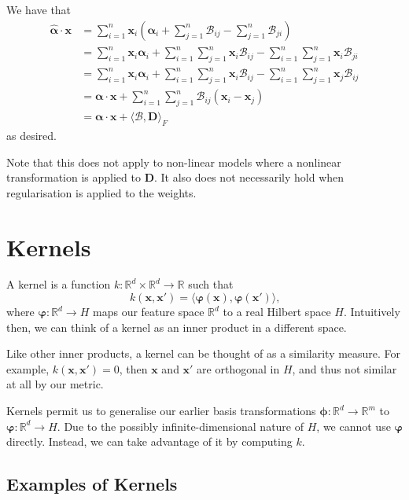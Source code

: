 \documentclass[11pt,twoside,openright]{report}
\newcommand\bphi{\bm{\phi}}
\newcommand\bvarphi{\bm{\varphi}}
\newcommand\bbR{\mathbb{R}}
\newcommand\bx{\mathbf{x}}
\begin{document}
We have that\begin{align*}
    \hat{\bm{\alpha}} \cdot \mathbf{x} &= \sum_{i=1}^n \mathbf{x}_i\left( \bm{\alpha}_i + \sum_{j=1}^n \mathcal{B}_{ij} - \sum_{j=1}^n \mathcal{B}_{ji} \right) \\
    &= \sum_{i=1}^n \mathbf{x}_i\bm{\alpha}_i +  \sum_{i=1}^n \sum_{j=1}^n \mathbf{x}_i \mathcal{B}_{ij} - \sum_{i=1}^n \sum_{j=1}^n \mathbf{x}_i \mathcal{B}_{ji} \\
    &= \sum_{i=1}^n \mathbf{x}_i\bm{\alpha}_i +  \sum_{i=1}^n \sum_{j=1}^n \mathbf{x}_i \mathcal{B}_{ij} - \sum_{i=1}^n \sum_{j=1}^n \mathbf{x}_j \mathcal{B}_{ij} \\
    &= \bm{\alpha}\cdot\mathbf{x} +  \sum_{i=1}^n \sum_{j=1}^n \mathcal{B}_{ij} \left(\mathbf{x}_i - \mathbf{x}_j \right) \\
    &= \bm{\alpha}\cdot\mathbf{x} + \langle \mathcal{B}, \mathbf{D} \rangle_F
\end{align*} as desired.

Note that this does not apply to non-linear models where a nonlinear transformation is applied to $\mathbf{D}$. It also does not necessarily hold when regularisation is applied to the weights.

\section{Kernels}

A kernel is a function $k : \bbR^d \times \bbR^d \to \bbR$ such that \[
    k(\bx, \bx') = \langle \bvarphi\left(\bx\right), \bvarphi\left(\bx'\right)\rangle \text{,}
\] where $\bvarphi : \bbR^d \to H$ maps our feature space $\bbR^d$ to a real Hilbert space $H$. Intuitively then, we can think of a kernel as an inner product in a different space.

Like other inner products, a kernel can be thought of as a similarity measure. For example, $k(\bx, \bx') = 0$, then $\bx$ and $\bx'$ are orthogonal in $H$, and thus not similar at all by our metric.

Kernels permit us to generalise our earlier basis transformations $\bphi : \bbR^d \to \bbR^m$ to $\bvarphi : \bbR^d \to H$. Due to the possibly infinite-dimensional nature of $H$, we cannot use $\bvarphi$ directly. Instead, we can take advantage of it by computing $k$.

\subsection{Examples of Kernels}
\end{document}
